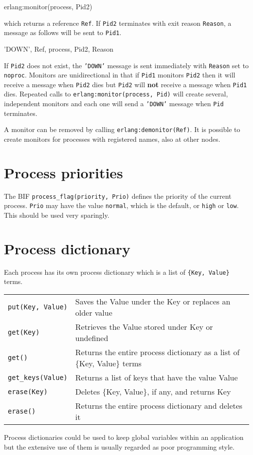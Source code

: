 \begin{erlang}
erlang:monitor(process, Pid2)
\end{erlang}

which returns a reference \texttt{Ref}. If \texttt{Pid2} terminates
with exit reason \texttt{Reason}, a message as follows will be sent to
\texttt{Pid1}.

\begin{erlang}
{'DOWN', Ref, process, Pid2, Reason}
\end{erlang}

If \texttt{Pid2} does not exist, the \texttt{'DOWN'} message is sent
immediately with \texttt{Reason} set to \texttt{noproc}. Monitors are
unidirectional in that if \texttt{Pid1} monitors \texttt{Pid2} then it
will receive a message when \texttt{Pid2} dies but \texttt{Pid2} will
\textbf{not} receive a message when \texttt{Pid1} dies. Repeated calls
to \texttt{erlang:monitor(process, Pid)} will create several,
independent monitors and each one will send a \texttt{'DOWN'} message
when \texttt{Pid} terminates.

A monitor can be removed by calling \texttt{erlang:demonitor(Ref)}. It
is possible to create monitors for processes with registered names,
also at other nodes.


\section{Process priorities}
The BIF \texttt{process\_flag(priority, Prio)} defines the priority of
the current process. \texttt{Prio} may have the value \texttt{normal},
which is the default, or \texttt{high} or \texttt{low}. This should be
used very sparingly.


\section{Process dictionary}
\label{processes:dicts}
Each process has its own process dictionary which is a list of
\texttt{\{Key, Value\}} terms.

\begin{center}
\begin{tabular}{|>{\raggedright}p{79pt}|>{\raggedright}p{247pt}|}
\hline
\multicolumn{2}{|p{326pt}|}{Process dictionary BIFs}\tabularnewline
\hline
\texttt{put(Key, Value)} & Saves the Value under the Key or replaces an older value\tabularnewline
\hline
\texttt{get(Key)} & Retrieves the Value stored under Key or undefined\tabularnewline
\hline
\texttt{get()} & Returns the entire process dictionary as a list of \{Key, Value\} terms\tabularnewline
\hline
\texttt{get\_keys(Value)} & Returns a list of keys that have the value Value\tabularnewline
\hline
\texttt{erase(Key)} & Deletes \{Key, Value\}, if any, and returns Key\tabularnewline
\hline
\texttt{erase()} & Returns the entire process dictionary and deletes it\tabularnewline
\hline
\end{tabular}
\end{center}

Process dictionaries could be used to keep global variables within an application but the extensive use of them is usually regarded as poor programming style.